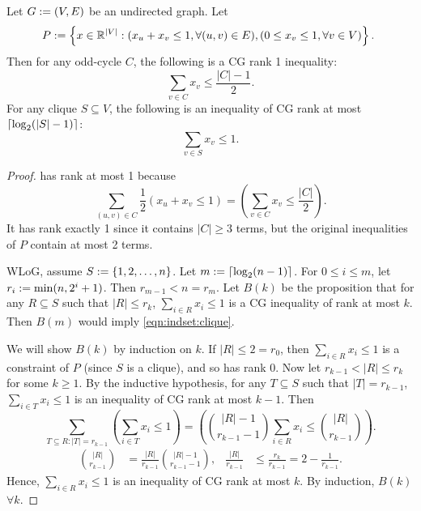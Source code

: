 \documentclass[a4paper,12pt,fleqn]{article}
\begin{document}
\begin{theorem}
Let $G := (V, E)$ be an undirected graph. Let
\[ P \defeq \left\{x \in \mathbb{R}^{|V|}: (x_u + x_v \le 1, \forall (u, v) \in E),
(0 \le x_v \le 1, \forall v \in V)\right\}. \]
Then for any odd-cycle $C$, the following is a CG rank 1 inequality:
\begin{equation}
\label{eqn:indset:odd-cycle}
\sum_{v \in C} x_v \le \frac{|C|-1}{2}.
\end{equation}
For any clique $S \subseteq V$, the following is an inequality of CG rank at most
$\left\lceil \log_2(|S|-1) \right\rceil$:
\begin{equation}
\label{eqn:indset:clique}
\sum_{v \in S} x_v \le 1.
\end{equation}
\end{theorem}
\begin{proof}
 has rank at most 1 because
\[ \sum_{(u, v) \in C} \frac{1}{2}\left(x_u + x_v \le 1\right)
= \left(\sum_{v \in C} x_v \le \frac{|C|}{2}\right). \]
It has rank exactly 1 since it contains $|C| \ge 3$ terms,
but the original inequalities of $P$ contain at most 2 terms.

WLoG, assume $S := \{1, 2, \ldots, n\}$. Let $m := \left\lceil \log_2(n-1) \right\rceil$.
For $0 \le i \le m$, let $r_i := \min(n, 2^i+1)$. Then $r_{m-1} < n = r_m$.
Let $B(k)$ be the proposition that for any $R \subseteq S$ such that $|R| \le r_k$,
$\sum_{i \in R} x_i \le 1$ is a CG inequality of rank at most $k$.
Then $B(m)$ would imply \cref{eqn:indset:clique}.

We will show $B(k)$ by induction on $k$.
If $|R| \le 2 = r_0$, then $\sum_{i \in R} x_i \le 1$ is a constraint of $P$
(since $S$ is a clique), and so has rank 0.
Now let $r_{k-1} < |R| \le r_k$ for some $k \ge 1$.
By the inductive hypothesis, for any $T \subseteq S$ such that $|T| = r_{k-1}$,
$\sum_{i \in T} x_i \le 1$ is an inequality of CG rank at most $k-1$. Then
\[ \sum_{T \subseteq R: |T| = r_{k-1}} \left(\sum_{i \in T} x_i \le 1\right)
= \left(\binom{|R|-1}{r_{k-1}-1} \sum_{i \in R} x_i \le \binom{|R|}{r_{k-1}} \right). \]
\begin{align*}
\binom{|R|}{r_{k-1}} &= \frac{|R|}{r_{k-1}}\binom{|R|-1}{r_{k-1}-1},
& \frac{|R|}{r_{k-1}} &\le \frac{r_k}{r_{k-1}} = 2 - \frac{1}{r_{k-1}}.
\end{align*}
Hence, $\sum_{i \in R} x_i \le 1$ is an inequality of CG rank at most $k$.
By induction, $B(k)$ $\forall k$.
\end{proof}
\end{document}
